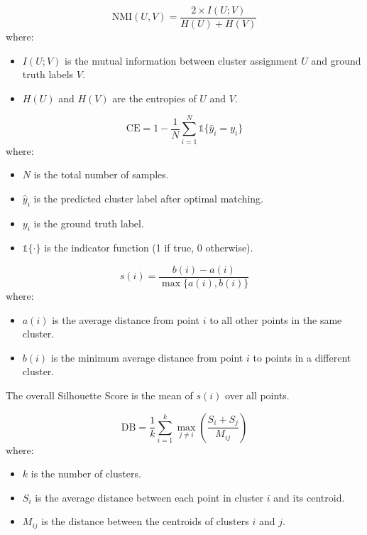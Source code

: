 \documentclass[
	10pt,
	parskip=half-,	
	paper=a4,
	english
	]{scrartcl}
\begin{document}
\begin{equation}
    \text{NMI}(U, V) = \frac{2 \times I(U; V)}{H(U) + H(V)}
    \label{eq9}
\end{equation}
where:
\begin{itemize}
    \item $I(U; V)$ is the mutual information between cluster assignment $U$ and ground truth labels $V$.
    \item $H(U)$ and $H(V)$ are the entropies of $U$ and $V$.
\end{itemize}

\begin{equation}
    \text{CE} = 1 - \frac{1}{N} \sum_{i=1}^{N} \mathbb{1}\{ \hat{y}_i = y_i \}
    \label{eq10}
\end{equation}
where:
\begin{itemize}
    \item $N$ is the total number of samples.
    \item $\hat{y}_i$ is the predicted cluster label after optimal matching.
    \item $y_i$ is the ground truth label.
    \item $\mathbb{1}\{\cdot\}$ is the indicator function (1 if true, 0 otherwise).
\end{itemize}

\begin{equation}
    s(i) = \frac{b(i) - a(i)}{\max\{a(i), b(i)\}}
    \label{eq11}
\end{equation}
where:
\begin{itemize}
    \item $a(i)$ is the average distance from point $i$ to all other points in the same cluster.
    \item $b(i)$ is the minimum average distance from point $i$ to points in a different cluster.
\end{itemize}
The overall Silhouette Score is the mean of $s(i)$ over all points.

\begin{equation}
    \text{DB} = \frac{1}{k} \sum_{i=1}^{k} \max_{j \neq i} \left( \frac{S_i + S_j}{M_{ij}} \right)
    \label{eq12}
\end{equation}
where:
\begin{itemize}
    \item $k$ is the number of clusters.
    \item $S_i$ is the average distance between each point in cluster $i$ and its centroid.
    \item $M_{ij}$ is the distance between the centroids of clusters $i$ and $j$.
\end{itemize}
\end{document}
